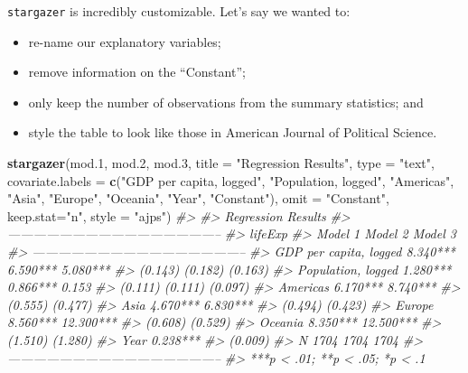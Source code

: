 \documentclass[]{book}
\newenvironment{Shaded}{\begin{snugshade}}{\end{snugshade}}
\newcommand{\KeywordTok}[1]{\textcolor[rgb]{0.13,0.29,0.53}{\textbf{#1}}}
\newcommand{\DataTypeTok}[1]{\textcolor[rgb]{0.13,0.29,0.53}{#1}}
\newcommand{\DecValTok}[1]{\textcolor[rgb]{0.00,0.00,0.81}{#1}}
\newcommand{\StringTok}[1]{\textcolor[rgb]{0.31,0.60,0.02}{#1}}
\newcommand{\CommentTok}[1]{\textcolor[rgb]{0.56,0.35,0.01}{\textit{#1}}}
\newcommand{\NormalTok}[1]{#1}
\providecommand{\tightlist}{%
  \setlength{\itemsep}{0pt}\setlength{\parskip}{0pt}}
\begin{document}
\texttt{stargazer} is incredibly customizable. Let's say we wanted to:

\begin{itemize}
\tightlist
\item
  re-name our explanatory variables;
\item
  remove information on the ``Constant'';\\
\item
  only keep the number of observations from the summary statistics; and
\item
  style the table to look like those in American Journal of Political
  Science.
\end{itemize}

\begin{Shaded}
\begin{Highlighting}[]
\KeywordTok{stargazer}\NormalTok{(mod.}\DecValTok{1}\NormalTok{, mod.}\DecValTok{2}\NormalTok{, mod.}\DecValTok{3}\NormalTok{, }\DataTypeTok{title =} \StringTok{"Regression Results"}\NormalTok{, }\DataTypeTok{type =} \StringTok{"text"}\NormalTok{, }
          \DataTypeTok{covariate.labels  =} \KeywordTok{c}\NormalTok{(}\StringTok{"GDP per capita, logged"}\NormalTok{, }\StringTok{"Population, logged"}\NormalTok{, }\StringTok{"Americas"}\NormalTok{, }\StringTok{"Asia"}\NormalTok{, }\StringTok{"Europe"}\NormalTok{, }\StringTok{"Oceania"}\NormalTok{, }\StringTok{"Year"}\NormalTok{, }\StringTok{"Constant"}\NormalTok{), }
          \DataTypeTok{omit =} \StringTok{"Constant"}\NormalTok{, }
          \DataTypeTok{keep.stat=}\StringTok{"n"}\NormalTok{, }\DataTypeTok{style =} \StringTok{"ajps"}\NormalTok{)}
\CommentTok{#> }
\CommentTok{#> Regression Results}
\CommentTok{#> --------------------------------------------------}
\CommentTok{#>                                  lifeExp          }
\CommentTok{#>                        Model 1  Model 2   Model 3 }
\CommentTok{#> --------------------------------------------------}
\CommentTok{#> GDP per capita, logged 8.340*** 6.590*** 5.080*** }
\CommentTok{#>                        (0.143)  (0.182)   (0.163) }
\CommentTok{#> Population, logged     1.280*** 0.866***   0.153  }
\CommentTok{#>                        (0.111)  (0.111)   (0.097) }
\CommentTok{#> Americas                        6.170*** 8.740*** }
\CommentTok{#>                                 (0.555)   (0.477) }
\CommentTok{#> Asia                            4.670*** 6.830*** }
\CommentTok{#>                                 (0.494)   (0.423) }
\CommentTok{#> Europe                          8.560*** 12.300***}
\CommentTok{#>                                 (0.608)   (0.529) }
\CommentTok{#> Oceania                         8.350*** 12.500***}
\CommentTok{#>                                 (1.510)   (1.280) }
\CommentTok{#> Year                                     0.238*** }
\CommentTok{#>                                           (0.009) }
\CommentTok{#> N                        1704     1704     1704   }
\CommentTok{#> --------------------------------------------------}
\CommentTok{#> ***p < .01; **p < .05; *p < .1}
\end{Highlighting}
\end{Shaded}
\end{document}
